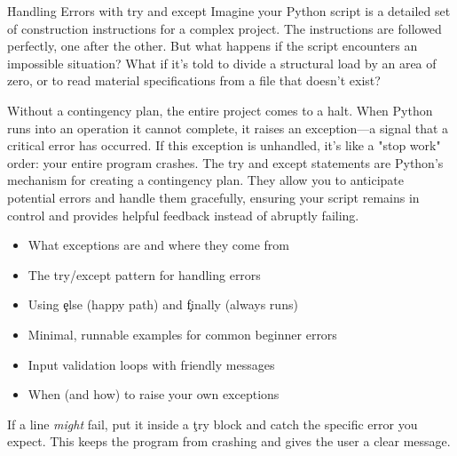 \h{Handling Errors with try and except}
Imagine your Python script is a detailed set of construction instructions for a complex project. The instructions are followed perfectly, one after the other. But what happens if the script encounters an impossible situation? What if it's told to divide a structural load by an area of zero, or to read material specifications from a file that doesn't exist?

Without a contingency plan, the entire project comes to a halt. When Python runs into an operation it cannot complete, it raises an exception—a signal that a critical error has occurred. If this exception is unhandled, it's like a "stop work" order: your entire program crashes. The try and except statements are Python's mechanism for creating a contingency plan. They allow you to anticipate potential errors and handle them gracefully, ensuring your script remains in control and provides helpful feedback instead of abruptly failing.

\begin{tcolorbox}[%
    title=Focus of this chapter:,
    colframe=orange,
    colback = white,
    arc=2mm %
 ]
\begin{itemize}
    \item What exceptions are and where they come from
    \item The try/except pattern for handling errors
    \item Using \c{else} (happy path) and \c{finally} (always runs)
    \item Minimal, runnable examples for common beginner errors
    \item Input validation loops with friendly messages
    \item When (and how) to raise your own exceptions
\end{itemize}
\end{tcolorbox}


If a line \emph{might} fail, put it inside a \c{try} block and catch the specific error you expect. This keeps the program from crashing and gives the user a clear message.


